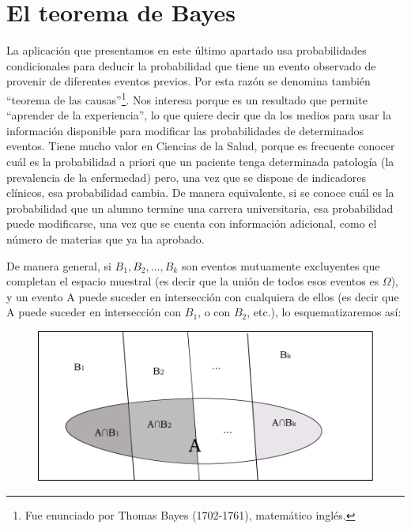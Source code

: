 \documentclass[]{book}
\let\rmarkdownfootnote\footnote%
\def\footnote{\protect\rmarkdownfootnote}
\begin{document}
\hypertarget{el-teorema-de-bayes}{%
\section{El teorema de Bayes}\label{el-teorema-de-bayes}}

La aplicación que presentamos en este último apartado usa probabilidades
condicionales para deducir la probabilidad que tiene un evento observado
de provenir de diferentes eventos previos. Por esta razón se denomina
también ``teorema de las causas''\footnote{Fue enunciado por Thomas Bayes (1702-1761), matemático inglés.}. Nos interesa porque es un
resultado que permite ``aprender de la experiencia'', lo que quiere decir
que da los medios para usar la información disponible para modificar las
probabilidades de determinados eventos. Tiene mucho valor en Ciencias de
la Salud, porque es frecuente conocer cuál es la probabilidad a priori
que un paciente tenga determinada patología (la prevalencia de la
enfermedad) pero, una vez que se dispone de indicadores clínicos, esa
probabilidad cambia. De manera equivalente, si se conoce cuál es la
probabilidad que un alumno termine una carrera universitaria, esa
probabilidad puede modificarse, una vez que se cuenta con información
adicional, como el número de materias que ya ha aprobado.

De manera general, si \(B_{1}, B_{2}, \ldots, B_{k}\) son eventos mutuamente excluyentes que completan el espacio muestral (es decir que la unión de todos esos eventos es \(\Omega\)), y un evento A puede suceder en intersección con cualquiera de ellos (es decir que A puede suceder en intersección con \(B_{1}\), o con \(B_{2}\), etc.), lo esquematizaremos así:

\begin{figure}

{\centering \includegraphics{imagenes/image93} 

}

\end{figure}
\end{document}
